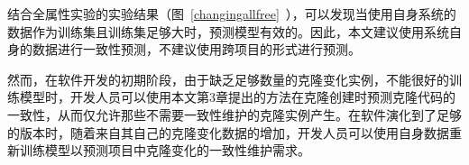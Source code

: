 结合全属性实验的实验结果（图~\ref{changingallfree}~），可以发现当使用自身系统的数据作为训练集且训练集足够大时，预测模型有效的。因此，本文建议使用系统自身的数据进行一致性预测，不建议使用跨项目的形式进行预测。

然而，在软件开发的初期阶段，由于缺乏足够数量的克隆变化实例，不能很好的训练模型时，开发人员可以使用本文第3章提出的方法在克隆创建时预测克隆代码的一致性，从而仅允许那些不需要一致性维护的克隆实例产生。在软件演化到了足够的版本时，随着来自其自己的克隆变化数据的增加，开发人员可以使用自身数据重新训练模型以预测项目中克隆变化的一致性维护需求。

